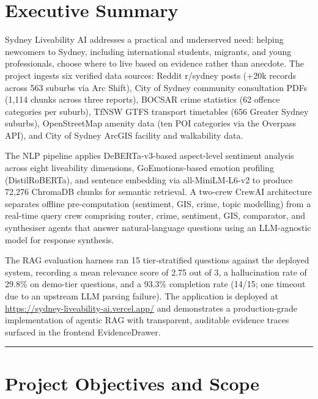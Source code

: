 \documentclass[11pt,a4paper]{article}
\begin{document}
{\setlength{\parskip}{0pt}\tableofcontents}
\newpage

\clearpage
\section{Executive Summary}\label{1-executive-summary}

Sydney Liveability AI addresses a practical and underserved need: helping newcomers to Sydney, including international students, migrants, and young professionals, choose where to live based on evidence rather than anecdote. The project ingests six verified data sources: Reddit r/sydney posts (+20k records across 563 suburbs via Arc Shift), City of Sydney community consultation PDFs (1,114 chunks across three reports), BOCSAR crime statistics (62 offence categories per suburb), TfNSW GTFS transport timetables (656 Greater Sydney suburbs), OpenStreetMap amenity data (ten POI categories via the Overpass API), and City of Sydney ArcGIS facility and walkability data.

The NLP pipeline applies DeBERTa-v3-based aspect-level sentiment analysis across eight liveability dimensions, GoEmotions-based emotion profiling (DistilRoBERTa), and sentence embedding via all-MiniLM-L6-v2 to produce 72,276 ChromaDB chunks for semantic retrieval. A two-crew CrewAI architecture separates offline pre-computation (sentiment, GIS, crime, topic modelling) from a real-time query crew comprising router, crime, sentiment, GIS, comparator, and synthesiser agents that answer natural-language questions using an LLM-agnostic model for response synthesis.

The RAG evaluation harness ran 15 tier-stratified questions against the deployed system, recording a mean relevance score of 2.75 out of 3, a hallucination rate of 29.8\% on demo-tier questions, and a 93.3\% completion rate (14/15; one timeout due to an upstream LLM parsing failure). The application is deployed at \url{https://sydney-liveability-ai.vercel.app/} and demonstrates a production-grade implementation of agentic RAG with transparent, auditable evidence traces surfaced in the frontend EvidenceDrawer.

\begin{center}\rule{0.5\linewidth}{0.5pt}\end{center}

\clearpage
\section{Project Objectives and Scope}\label{2-project-objectives-and-scope}
\end{document}
